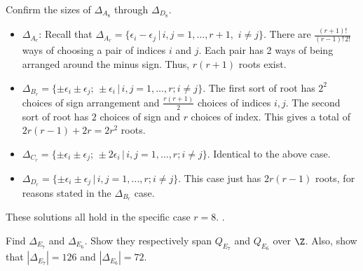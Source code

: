 \documentclass[11pt]{article}
\newenvironment{exercise}[1][Exercise]{\begin{trivlist}
\item[\hskip \labelsep {\bfseries #1}]}{\end{trivlist}}
\newenvironment{solution}[1][Solution]{\begin{trivlist}
\item[\hskip \labelsep {\bfseries #1}]}{\end{trivlist}}
\newcommand{\qed}{\nobreak \ifvmode \relax \else
      \ifdim\lastskip<1.5em \hskip-\lastskip
      \hskip1.5em plus0em minus0.5em \fi \nobreak
      \vrule height0.75em width0.5em depth0.25em\fi}
\begin{document}
%
%
\begin{exercise}
Confirm the sizes of $\Delta_{A_8}$ through $\Delta_{D_8}$.
\end{exercise}

\begin{solution}
\begin{itemize}
\item $\Delta_{A_r}$:  Recall that $\Delta_{A_r} = \{ \epsilon_i -
\epsilon_j \, | \, i,j=1,\ldots,r+1, \,\, i \not = j \}$.
%
There are $\frac{(r+1)!}{(r-1)! \, 2!}$ ways of choosing a pair of
indices $i$ and $j$. Each pair has 2 ways of being arranged around
the minus sign. Thus, $r (r+1)$ roots exist.
%
\item $\Delta_{B_r} = \{ \pm \epsilon_i \pm \epsilon_j; \, \pm
\epsilon_i \, | \, i,j=1,\ldots,r; i \not = j \}$.  The first sort
of root has $2^2$ choices of sign arrangement and
$\frac{r(r+1)}{2}$ choices of indices $i,j$.  The second sort of
root has $2$ choices of sign and $r$ choices of index.  This gives
a total of $2r(r-1) + 2r = 2r^2$ roots.
%
\item $\Delta_{C_r} = \{ \pm \epsilon_i \pm \epsilon_j; \, \pm 2
\epsilon_i \, | \, i,j=1,\ldots,r; i \not = j \}$.  Identical to
the above case.
%
\item $\Delta_{D_r} = \{ \pm \epsilon_i \pm \epsilon_j \, | \,
i,j=1,\ldots,r; i \not = j \}$.  This case just has $2r(r-1)$
roots, for reasons stated in the $\Delta_{B_r}$ case.
%
\end{itemize}
These solutions all hold in the specific case $r=8$.  \qed.
\end{solution}
%
%
\begin{exercise}
Find $\Delta_{E_7}$ and $\Delta_{E_6}$.  Show they respectively
span $Q_{E_7}$ and $Q_{E_6}$ over $\Z$.  Also, show that $\left|
\Delta_{E_7} \right| = 126$ and $\left| \Delta_{E_6} \right| =
72$.
\end{exercise}
%
\end{document}
